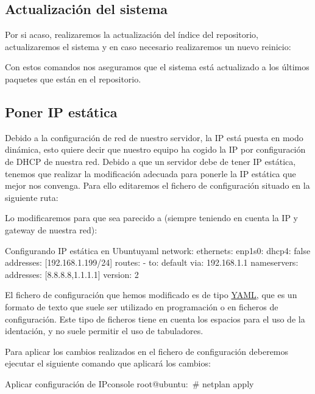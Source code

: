 \subsection{Actualización del sistema}
Por si acaso, realizaremos la actualización del índice del repositorio, actualizaremos el sistema y en caso necesario realizaremos un nuevo reinicio:


Con estos comandos nos aseguramos que el sistema está actualizado a los últimos paquetes que están en el repositorio.


\hypertarget{configurar_ip_estatica_ubuntu}{}
\subsection{Poner IP estática}
Debido a la configuración de red de nuestro servidor, la IP está puesta en modo dinámica, esto quiere decir que nuestro equipo ha cogido la IP por configuración de DHCP de nuestra red. Debido a que un servidor debe de tener IP estática, tenemos que realizar la modificación adecuada para ponerle la IP estática que mejor nos convenga. Para ello editaremos el fichero de configuración situado en la siguiente ruta: 

Lo modificaremos para que sea parecido a (siempre teniendo en cuenta la IP y gateway de nuestra red):


\begin{mycode}{Configurando IP estática en Ubuntu}{yaml}{}
network:
  ethernets:
    enp1s0:
      dhcp4: false
      addresses: [192.168.1.199/24]
      routes:
      - to: default
        via: 192.168.1.1
      nameservers:
        addresses: [8.8.8.8,1.1.1.1]
  version: 2
\end{mycode}

El fichero de configuración que hemos modificado es de tipo \href{https://es.wikipedia.org/wiki/YAML}{YAML}, que es un formato de texto que suele ser utilizado en programación o en ficheros de configuración. Este tipo de ficheros tiene en cuenta los espacios para el uso de la identación, y no suele permitir el uso de tabuladores.

Para aplicar los cambios realizados en el fichero de configuración deberemos ejecutar el siguiente comando que aplicará los cambios:

\begin{mycode}{Aplicar configuración de IP}{console}{}
root@ubuntu:~# netplan apply
\end{mycode}

\clearpage